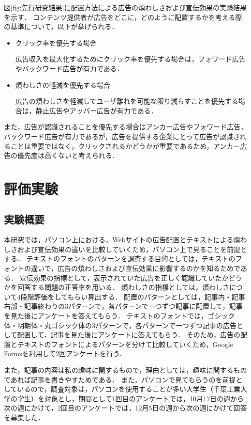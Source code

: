 \documentclass[12pt,a4j,titlepage]{ltjsarticle}
\begin{document}
図\ref{fig:先行研究結果}に配置方法による広告の煩わしさおよび宣伝効果の実験結果を示す．
コンテンツ提供者が広告をどこに，どのように配置するかを考える際の基準について，以下が挙げられる．

\begin{itemize}
\item クリック率を優先する場合

広告収入を最大化するためにクリック率を優先する場合は，フォワード広告やバックワード広告が有力である．

\item 煩わしさの軽減を優先する場合

広告の煩わしさを軽減してユーザ離れを可能な限り減らすことを優先する場合は，静止広告やアッパー広告が有力である．
\end{itemize}

また，広告が認識されることを優先する場合はアンカー広告やフォワード広告，バックワード広告が有力であるが，広告を提供する企業にとって広告が認識されることは重要ではなく，クリックされるかどうかが重要であるため，アンカー広告の優先度は高くないと考えられる．

\clearpage

\section{評価実験}
\subsection{実験概要}
本研究では，パソコン上における，Webサイトの広告配置とテキストによる煩わしさおよび宣伝効果の違いを比較していくため，パソコン上で見ることを前提とする．
テキストのフォントのパターンを調査する目的としては，テキストのフォントの違いで，広告の煩わしさおよび宣伝効果に影響するのかを知るためである．
宣伝効果の指標として，表示されていた広告を正しく認識していたかどうかを回答する問題の正答率を用いる．
煩わしさの指標としては，煩わしさについて4段階評価をしてもらい算出する．
配置のパターンとしては，記事内・記事右部・記事終わりの3パターンで，各パターンで一つずつ記事に配置して，記事を見た後にアンケートを答えてもらう．
テキストのフォントでは，ゴシック体・明朝体・丸ゴシック体の3パターンで，各パターンで一つずつ記事の広告として配置して，記事を見た後にアンケートに答えてもらう．
そのため，広告の配置とテキストのフォントによるパターンを分けて比較していくため，Google Formsを利用して2回アンケートを行う．

また，記事の内容は私の趣味に関するもので，理由としては，趣味に関するものであれば記事を書きやすためである．
また，パソコンで見てもらうのを前提としているので，調査対象は，パソコンを使用することが多い大学生（千葉工業大学の学生）を対象とし，期間として1回目のアンケートでは，10月17日の週から次の週にかけて，2回目のアンケートでは，12月5日の週から次の週にかけて回答を募集した．
\end{document}
